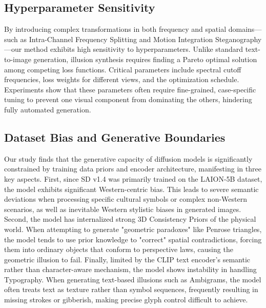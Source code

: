 \documentclass{article}
\begin{document}
\subsection{Hyperparameter Sensitivity}
By introducing complex transformations in both frequency and spatial domains—such as Intra-Channel Frequency Splitting and Motion Integration Steganography—our method exhibits high sensitivity to hyperparameters. Unlike standard text-to-image generation, illusion synthesis requires finding a Pareto optimal solution among competing loss functions. Critical parameters include spectral cutoff frequencies, loss weights for different views, and the optimization schedule. Experiments show that these parameters often require fine-grained, case-specific tuning to prevent one visual component from dominating the others, hindering fully automated generation.

\subsection{Dataset Bias and Generative Boundaries}
Our study finds that the generative capacity of diffusion models is significantly constrained by training data priors and encoder architecture, manifesting in three key aspects. First, since SD v1.4 was primarily trained on the LAION-5B dataset, the model exhibits significant Western-centric bias. This leads to severe semantic deviations when processing specific cultural symbols or complex non-Western scenarios, as well as inevitable Western stylistic biases in generated images. Second, the model has internalized strong 3D Consistency Priors of the physical world. When attempting to generate "geometric paradoxes" like Penrose triangles\cite{dodik2025meschers}, the model tends to use prior knowledge to "correct" spatial contradictions, forcing them into ordinary objects that conform to perspective laws, causing the geometric illusion to fail. Finally, limited by the CLIP text encoder's semantic rather than character-aware mechanism, the model shows instability in handling Typography. When generating text-based illusions such as Ambigrams, the model often treats text as texture rather than symbol sequences, frequently resulting in missing strokes or gibberish, making precise glyph control difficult to achieve.
\end{document}
